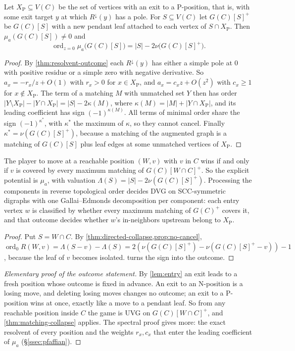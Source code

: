 \documentclass[final]{siamart0516}
\numberwithin{theorem}{section}
\numberwithin{equation}{section}
\theoremstyle{siamnonum}
\theoremstyle{plain}
\newcommand{\ord}{\operatorname{ord}}
\newcommand{\Rdown}{R^{\downarrow}}
\newcommand{\Pw}{\mathrm{P}}   %
\begin{document}
\begin{proposition}\label{prop:no-cancel}
Let $X_{\Pw}\subseteq V(C)$ be the set of vertices with an exit to a P-position, that is, with some exit target $y$ at which $\Rdown(y)$ has a pole. For $S\subseteq V(C)$ let $G(C)[S]^{+}$ be $G(C)[S]$ with a new pendant leaf attached to each vertex of $S\cap X_{\Pw}$. Then $\mu_a(G(C)[S])\neq0$ and
\[
\ord_{z=0}\mu_a\bigl(G(C)[S]\bigr)=|S|-2\nu\bigl(G(C)[S]^{+}\bigr).
\]
\end{proposition}
\begin{proof}
By \cref{thm:resolvent-outcome} each $\Rdown(y)$ has either a simple pole at $0$ with positive residue or a simple zero with negative derivative. So $a_x=-r_x/z+O(1)$ with $r_x>0$ for $x\in X_{\Pw}$, and $a_x=c_xz+O(z^2)$ with $c_x\ge1$ for $x\notin X_{\Pw}$. The term of a matching $M$ with unmatched set $Y$ then has order $|Y\setminus X_{\Pw}|-|Y\cap X_{\Pw}|=|S|-2\kappa(M)$, where $\kappa(M)=|M|+|Y\cap X_{\Pw}|$, and its leading coefficient has sign $(-1)^{\kappa(M)}$. All terms of minimal order share the sign $(-1)^{\kappa^{*}}$, with $\kappa^{*}$ the maximum of $\kappa$, so they cannot cancel. Finally $\kappa^{*}=\nu(G(C)[S]^{+})$, because a matching of the augmented graph is a matching of $G(C)[S]$ plus leaf edges at some unmatched vertices of $X_{\Pw}$.
\end{proof}

\begin{corollary}\label{cor:dvg-poly}
The player to move at a reachable position $(W,v)$ with $v$ in $C$ wins if and only if $v$ is covered by every maximum matching of $G(C)[W\cap C]^{+}$. So the explicit potential is $\mu_a$, with valuation $\Lambda(S)=|S|-2\nu(G(C)[S]^{+})$. Processing the components in reverse topological order decides DVG on SCC-symmetric digraphs with one Gallai--Edmonds decomposition per component: each entry vertex $w$ is classified by whether every maximum matching of $G(C)^{+}$ covers it, and that outcome decides whether $w$'s in-neighbors upstream belong to $X_{\Pw}$.
\end{corollary}
\begin{proof}
Put $S=W\cap C$. By \cref{thm:directed-collapse,prop:no-cancel}, $\ord_0R(W,v)=\Lambda(S-v)-\Lambda(S)=2(\nu(G(C)[S]^{+})-\nu(G(C)[S]^{+}-v))-1$, because the leaf of $v$ becomes isolated.  turns the sign into the outcome.
\end{proof}

\begin{proof}[Elementary proof of the outcome statement]
By \cref{lem:entry} an exit leads to a fresh position whose outcome is fixed in advance. An exit to an N-position is a losing move, and deleting losing moves changes no outcome; an exit to a P-position wins at once, exactly like a move to a pendant leaf. So from any reachable position inside $C$ the game is UVG on $G(C)[W\cap C]^{+}$, and \cref{thm:matching-collapse} applies. The spectral proof gives more: the exact resolvent of every position and the weights $r_x,c_x$ that enter the leading coefficient of $\mu_a$ (\S\ref{ssec:pfaffian}).
\end{proof}
\end{document}
